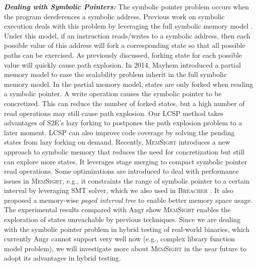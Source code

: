 \documentclass{cta-author}
\newcommand{\prototype}{\textsc{Breacher} }
\begin{document}
\noindent\textit{\textbf{Dealing with Symbolic Pointers:}}
The symbolic pointer problem occurs when the program dereferences a symbolic address. 
Previous work on symbolic execution deals with this problem by leveraging the full symbolic memory model \cite{song2008bitblaze, thakur2010directed, brumley2011bap, trtik2014symbolic}. Under this model, if an instruction reads/writes to a symbolic address, then each possible value of this address will fork a corresponding state so that all possible paths can be exercised.
As previously discussed, forking state for each possible value will quickly cause path explosion. 
In 2014, Mayhem \cite{cha2012unleashing} introduced a partial memory model to ease the scalability problem inherit in the full symbolic memory model. 
In the partial memory model, states are only forked when reading a symbolic pointer.
A write operation causes the symbolic pointer to be concretized.
This can reduce the number of forked states, but a high number of read operations may still cause path explosion.
Our LCSP method takes advantages of S2E's lazy forking to postpones the path explosion problem to a later moment. 
LCSP can also improve code coverage by solving the pending states from lazy forking on demand.
Recently, \textsc{MemSight} \cite{Coppa:2017:RPR:3155562.3155638} introduces a new approach 
to symbolic memory that reduces the need for concretization but still can explore more states.
It leverages stage merging \cite{Avgerinos:2014:ESE:2568225.2568293} to compact symbolic 
pointer read operations. Some optimizations are introduced to deal with performance issues
in \textsc{MemSight}, e.g., it constraints the range of symbolic pointer to a certain interval by leveraging SMT solver, which we also used in \prototype. It also proposed  a
memory-wise \emph{paged interval tree} to enable better memory space usage. The experimental
results compared with Angr show \textsc{MemSight} enables the exploration
of states unreachable by previous techniques. Since we are dealing with the symbolic pointer
problem in hybrid testing of real-world binaries, which currently Angr cannot support very
well now (e.g., complex library function model problem), we will investigate more about \textsc{MemSight} in the near future to adopt its advantages in hybrid testing.
\end{document}
